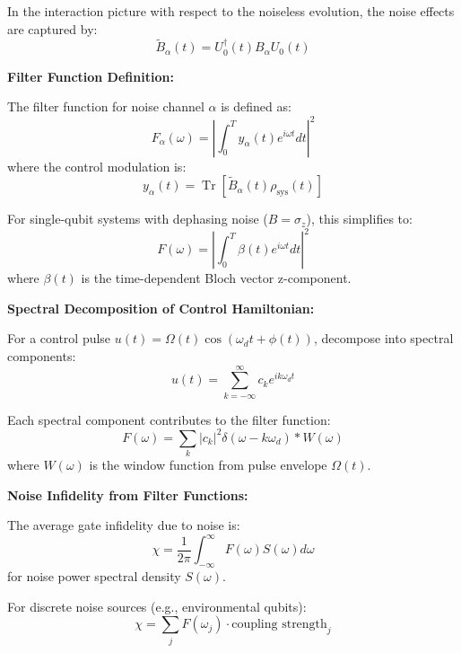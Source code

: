 \documentclass[11pt,a4paper]{article}
\theoremstyle{definition}
\theoremstyle{remark}
\renewcommand{\Tr}{\operatorname{Tr}}
\begin{document}
In the interaction picture with respect to the noiseless evolution, the noise effects are captured by:
\begin{equation}
\tilde{B}_\alpha(t) = U_0^\dagger(t) B_\alpha U_0(t)
\end{equation}

\textbf{Filter Function Definition:}

The filter function for noise channel $\alpha$ is defined as:
\begin{equation}
F_\alpha(\omega) = \left|\int_0^T y_\alpha(t)e^{i\omega t}dt\right|^2
\end{equation}
where the control modulation is:
\begin{equation}
y_\alpha(t) = \Tr\left[\tilde{B}_\alpha(t)\rho_{\text{sys}}(t)\right]
\end{equation}

For single-qubit systems with dephasing noise ($B = \sigma_z$), this simplifies to:
\begin{equation}
F(\omega) = \left|\int_0^T \beta(t)e^{i\omega t}dt\right|^2
\end{equation}
where $\beta(t)$ is the time-dependent Bloch vector z-component.

\textbf{Spectral Decomposition of Control Hamiltonian:}

For a control pulse $u(t) = \Omega(t)\cos(\omega_d t + \phi(t))$, decompose into spectral components:
\begin{equation}
u(t) = \sum_{k=-\infty}^{\infty} c_k e^{ik\omega_d t}
\end{equation}

Each spectral component contributes to the filter function:
\begin{equation}
F(\omega) = \sum_k |c_k|^2 \delta(\omega - k\omega_d) * W(\omega)
\end{equation}
where $W(\omega)$ is the window function from pulse envelope $\Omega(t)$.

\textbf{Noise Infidelity from Filter Functions:}

The average gate infidelity due to noise is:
\begin{equation}
\chi = \frac{1}{2\pi}\int_{-\infty}^{\infty} F(\omega)S(\omega)d\omega
\end{equation}
for noise power spectral density $S(\omega)$.

For discrete noise sources (e.g., environmental qubits):
\begin{equation}
\chi = \sum_j F(\omega_j) \cdot \text{coupling strength}_j
\end{equation}
\end{document}
